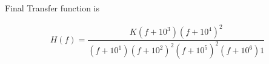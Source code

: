 \begin{enumerate}[label=\thesection.\arabic*.,ref=\thesection.\theenumi]
Final Transfer function is

\begin{align}
	H(f) = \dfrac{K(f+10^{3})(f+10^{4})^{2}}{(f+10^{1})(f+10^{2})^{2}(f+10^{5})^{2}(f+10^{6})1}
\end{align}
\\

\end{enumerate}
